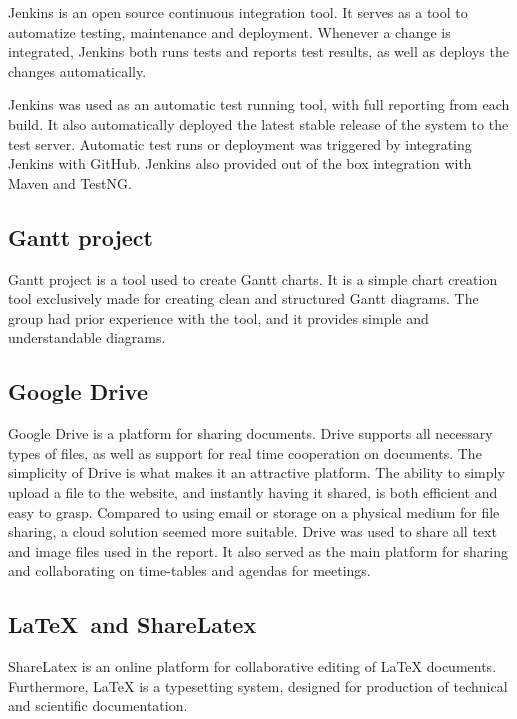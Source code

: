 Jenkins \cite{jenkins} is an open source continuous integration tool. It serves as a tool to automatize testing, maintenance and deployment. Whenever a change is integrated, Jenkins both runs tests and reports test results, as well as deploys the changes automatically.

Jenkins was used as an automatic test running tool, with full reporting from each build. It also automatically deployed the latest stable release of the system to the test server. Automatic test runs or deployment was triggered by integrating Jenkins with GitHub. Jenkins also provided out of the box integration with Maven and TestNG.

\subsection{Gantt project}
\label{subsec:prestudies-tools-gantt_project}

Gantt project \cite{gantt-project} is a tool used to create Gantt charts. It is a simple chart creation tool exclusively made for creating clean and structured Gantt diagrams. The group had prior experience with the tool, and it provides simple and understandable diagrams.

\subsection{Google Drive}
\label{subsec:prestudies-tools-google_drive}

Google Drive \cite{google-drive} is a platform for sharing documents. Drive supports all necessary types of files, as well as support for real time cooperation on documents. The simplicity of Drive is what makes it an attractive platform. The ability to simply upload a file to the website, and instantly having it shared, is both efficient and easy to grasp. Compared to using email or storage on a physical medium for file sharing, a cloud solution seemed more suitable. 
Drive was used to share all text and image files used in the report. It also served as the main platform for sharing and collaborating on time-tables and agendas for meetings.

\subsection{LaTeX\ and ShareLatex}
\label{subsec:prestudies-tools-latex_and_sharelatex}

ShareLatex \cite{sharelatex} is an online platform for collaborative editing of LaTeX documents. Furthermore, LaTeX is a typesetting system, designed for production of technical and scientific documentation.

